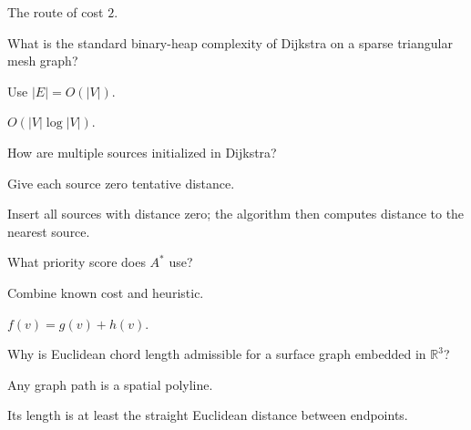 \begin{solution}
The route of cost \(2\).
\end{solution}

\begin{exercise}\label{exr:vii39-ped-02}
What is the standard binary-heap complexity of Dijkstra on a sparse triangular mesh graph?
\end{exercise}

\begin{hint}
Use \(|E|=O(|V|)\).
\end{hint}

\begin{solution}
\(O(|V|\log|V|)\).
\end{solution}

\begin{exercise}\label{exr:vii39-ped-03}
How are multiple sources initialized in Dijkstra?
\end{exercise}

\begin{hint}
Give each source zero tentative distance.
\end{hint}

\begin{solution}
Insert all sources with distance zero; the algorithm then computes distance to the nearest source.
\end{solution}

\begin{exercise}\label{exr:vii39-ped-04}
What priority score does \(A^*\) use?
\end{exercise}

\begin{hint}
Combine known cost and heuristic.
\end{hint}

\begin{solution}
\(f(v)=g(v)+h(v)\).
\end{solution}

\begin{exercise}\label{exr:vii39-ped-05}
Why is Euclidean chord length admissible for a surface graph embedded in \(\mathbb R^3\)?
\end{exercise}

\begin{hint}
Any graph path is a spatial polyline.
\end{hint}

\begin{solution}
Its length is at least the straight Euclidean distance between endpoints.
\end{solution}

